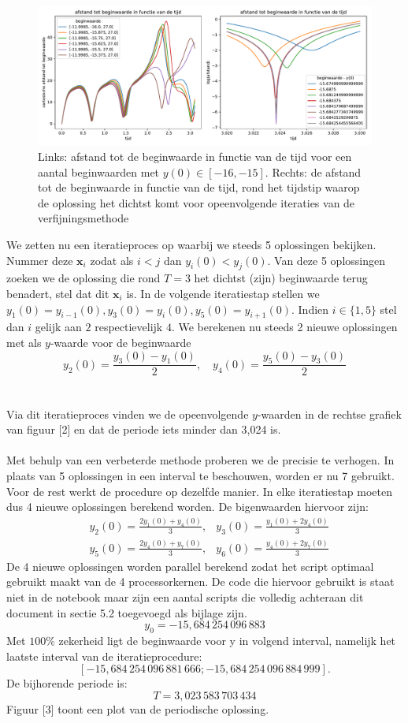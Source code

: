 \documentclass[12pt, a4paper]{article}
\newcommand{\x}{\textbf{x}}
\theoremstyle{definition}
\begin{document}
\begin{figure}[h]
    \centering
    \includegraphics[width=\linewidth]{afstand_beginwaarde_opdracht4.pdf}
    \caption{Links: afstand tot de beginwaarde in functie van de tijd voor een aantal beginwaarden met $y(0) \in [-16, -15]$. Rechts: de afstand tot de beginwaarde in functie van de tijd, rond het tijdstip waarop de oplossing het dichtst komt voor opeenvolgende iteraties van de verfijningsmethode}
    \label{fig: afstand}
\end{figure}

 We zetten nu een iteratieproces op waarbij we steeds 5 oplossingen bekijken. Nummer deze $\x_i$ zodat als $i<j$ dan $y_i(0) < y_j(0)$. Van deze 5 oplossingen zoeken we de oplossing die rond $T=3$ het dichtst (zijn) beginwaarde terug benadert, stel dat dit $\x_i$ is. In de volgende iteratiestap stellen we $y_1(0) = y_{i-1}(0), y_3(0) = y_i(0), y_5(0)=y_{i+1}(0)$. Indien $i \in \{1,5\}$ stel dan $i$ gelijk aan $2$ respectievelijk $4$. We berekenen nu steeds 2 nieuwe oplossingen met als $y$-waarde voor de beginwaarde $$y_2(0) = \frac{y_3(0)-y_1(0)}{2}, \quad y_4(0) = \frac{y_5(0)-y_3(0)}{2}$$\\
\\
Via dit iteratieproces vinden we de opeenvolgende $y$-waarden in de rechtse grafiek van figuur [2] en dat de periode iets minder dan 3,024 is.\\
\\
Met behulp van een verbeterde methode proberen we de precisie te verhogen. In plaats van 5 oplossingen in een interval te beschouwen, worden er nu 7 gebruikt. Voor de rest werkt de procedure op dezelfde manier. In elke iteratiestap moeten dus 4 nieuwe oplossingen berekend worden. De bigenwaarden hiervoor zijn:
\begin{align*}
&y_2(0) = \frac{2y_1(0) + y_4(0)}{3}, &y_3(0) = \frac{y_1(0) + 2y_4(0)}{3}\\
&y_5(0) = \frac{2y_4(0) + y_7(0)}{3}, &y_6(0) = \frac{y_4(0) + 2y_7(0)}{3}
\end{align*}
De 4 nieuwe oplossingen worden parallel berekend zodat het script optimaal gebruikt maakt van de 4 processorkernen. De code die hiervoor gebruikt is staat niet in de notebook maar zijn een aantal scripts die volledig achteraan dit document in sectie 5.2 toegevoegd als bijlage zijn.
$$y_0 = -15,684\, 254 \, 096 \, 883$$
Met $100\%$ zekerheid ligt de beginwaarde voor y in volgend interval, namelijk het laatste interval van de iteratieprocedure:
$$[-15,684\, 254 \, 096 \, 881 \, 666; -15,684\, 254 \, 096 \, 884 \, 999].$$
De bijhorende periode is:
$$T=3,023\, 583\, 703\, 434$$
Figuur [3] toont een plot van de periodische oplossing.
\end{document}
